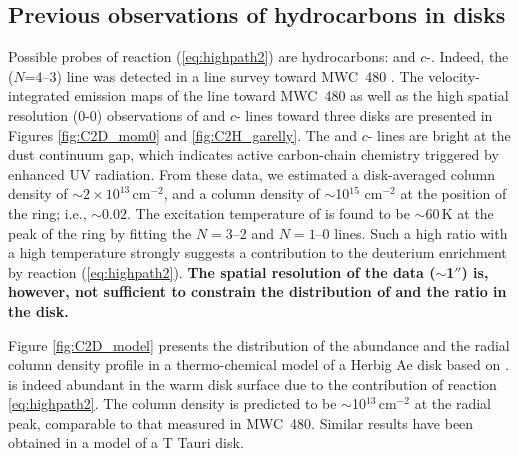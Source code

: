 \documentclass[12pt,a4paper]{article}  %
\begin{document}
\subsection{Previous observations of hydrocarbons in disks}
Possible probes of reaction (\ref{eq:highpath2}) are hydrocarbons:  and $c$-. Indeed, the  ($N$=4--3) line was detected in a line survey toward MWC~480 \citep{Loomis20}.
The velocity-integrated emission maps of the  line toward MWC~480 as well as the high spatial resolution (0-0) observations of  and $c$- lines toward three disks \citep{Guzman21} are presented in Figures \ref{fig:C2D_mom0} and \ref{fig:C2H_garelly}. The  and $c$- lines are bright at the dust continuum gap, which indicates active carbon-chain chemistry triggered by enhanced UV radiation. From these data, we estimated a disk-averaged  column density of $\sim2\times10^{13}$\,cm$^{-2}$, and a  column density of $\sim$10$^{15}$ cm$^{-2}$ at the position of the  ring; i.e.,  $\sim 0.02$. The excitation temperature of  is found to be $\sim$60\,K at the peak of the  ring by fitting the $N=3$--2 and $N=1$--0 lines. Such a high  ratio with a high temperature strongly suggests a contribution to the deuterium enrichment by reaction (\ref{eq:highpath2}). \textbf{The spatial resolution of the  data ($\sim$1$''$) is, however, not sufficient to constrain the distribution of  and the  ratio in the disk.}

Figure \ref{fig:C2D_model} presents the distribution of the  abundance and the radial column density profile in a thermo-chemical model of a Herbig Ae disk based on \citet{Aikawa18}.  is indeed abundant in the warm disk surface due to the contribution of reaction \eqref{eq:highpath2}. The column density is predicted to be $\sim$10$^{13}$\,cm$^{-2}$ at the radial peak, comparable to that measured in MWC~480. Similar results have been obtained in a model of a T Tauri disk.
\end{document}
